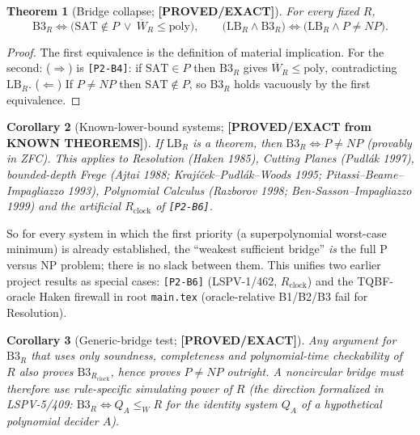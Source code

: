 \documentclass[11pt]{article}
\newtheorem{theorem}{Theorem}
\newtheorem{corollary}[theorem]{Corollary}
\theoremstyle{definition}
\theoremstyle{remark}
\newcommand{\SAT}{\mathrm{SAT}}
\newcommand{\Wbar}{\overline W}
\newcommand{\poly}{\mathrm{poly}}
\newcommand{\status}[1]{\textbf{[#1]}}
\begin{document}
\begin{theorem}[Bridge collapse; \status{PROVED/EXACT}]\label{thm:collapse}
For every fixed $R$,
\[
\mathrm{B3}_R\iff\bigl(\SAT\notin P\ \vee\ \Wbar_R\le\poly\bigr),
\qquad
\bigl(\mathrm{LB}_R\wedge\mathrm{B3}_R\bigr)\iff\bigl(\mathrm{LB}_R\wedge P\neq NP\bigr).
\]
\end{theorem}

\begin{proof}
The first equivalence is the definition of material implication. For the
second: ($\Rightarrow$) is \texttt{[P2-B4]}: if $\SAT\in P$ then
$\mathrm{B3}_R$ gives $\Wbar_R\le\poly$, contradicting $\mathrm{LB}_R$.
($\Leftarrow$) If $P\ne NP$ then $\SAT\notin P$, so $\mathrm{B3}_R$ holds
vacuously by the first equivalence.
\end{proof}

\begin{corollary}[Known-lower-bound systems; \status{PROVED/EXACT from KNOWN THEOREMS}]\label{cor:known}
If $\mathrm{LB}_R$ is a theorem, then $\mathrm{B3}_R\iff P\ne NP$ (provably in
ZFC). This applies to Resolution (Haken 1985), Cutting Planes (Pudl\'ak 1997),
bounded-depth Frege (Ajtai 1988; Kraj\'i\v{c}ek--Pudl\'ak--Woods 1995;
Pitassi--Beame--Impagliazzo 1993), Polynomial Calculus
(Razborov 1998; Ben-Sasson--Impagliazzo 1999) and the artificial
$R_{\mathrm{clock}}$ of \texttt{[P2-B6]}.
\end{corollary}

So for every system in which the first priority (a superpolynomial worst-case
minimum) is already established, the ``weakest sufficient bridge'' \emph{is}
the full P versus NP problem; there is no slack between them. This unifies two
earlier project results as special cases: \texttt{[P2-B6]} (LSPV-1/462,
$R_{\mathrm{clock}}$) and the TQBF-oracle Haken firewall in root
\texttt{main.tex} (oracle-relative B1/B2/B3 fail for Resolution).

\begin{corollary}[Generic-bridge test; \status{PROVED/EXACT}]\label{cor:generic}
Any argument for $\mathrm{B3}_R$ that uses only soundness, completeness and
polynomial-time checkability of $R$ also proves $\mathrm{B3}_{R_{\mathrm{clock}}}$, hence
proves $P\ne NP$ outright. A noncircular bridge must therefore use rule-specific
\emph{simulating power} of $R$ (the direction formalized in LSPV-5/409:
$\mathrm{B3}_R\iff Q_A\le_W R$ for the identity system $Q_A$ of a hypothetical
polynomial decider $A$).
\end{corollary}
\end{document}
